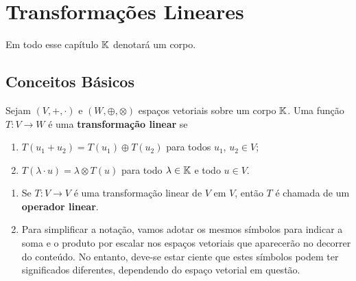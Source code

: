 
\chapter{Transformações Lineares}

Em todo esse capítulo $\mathbb{K}$ denotará um corpo.

\section{Conceitos Básicos}

\begin{definicao}
    Sejam $(V, +, \cdot)$ e $(W, \oplus, \otimes)$ espaços vetoriais sobre um corpo $\mathbb{K}$. Uma função $T \colon V \to W$ é uma \textbf{transformação linear} se
    \begin{enumerate}[label={\roman*})]
        \item $T(u_1 + u_2) = T(u_1) \oplus T(u_2)$ para todos $u_1$, $u_2 \in V$;
        \item $T(\lambda \cdot u) = \lambda \otimes T(u)$ para todo $\lambda \in \mathbb{K}$ e todo $u \in V$.
    \end{enumerate}
\end{definicao}

\begin{observacoes}
    \begin{enumerate}[label={\roman*})]
        \item Se $T \colon V \to V$ é uma transformação linear de $V$ em $V$, então $T$ é chamada de um \textbf{operador linear}.

        \item Para simplificar a notação, vamos adotar os mesmos símbolos para indicar a soma e o produto por escalar nos espaços vetoriais que aparecerão no decorrer do conteúdo. No entanto, deve-se estar ciente que estes símbolos podem ter significados diferentes, dependendo do espaço vetorial em questão.
    \end{enumerate}
\end{observacoes}

